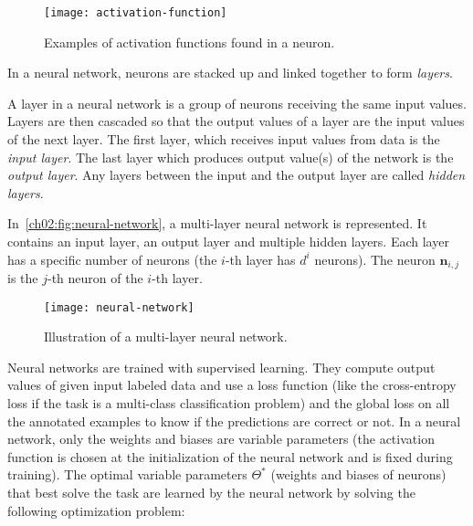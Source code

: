     \begin{figure}[h!]
      \centering
      \texttt{[image: activation-function]}
      \caption{Examples of activation functions found in a neuron.}
      \label{ch02:fig:activation-function}
    \end{figure}

    \medskip
    In a neural network, neurons are stacked up and linked together to form
    \textit{layers}.

    \theoremstyle{definition}
    \begin{definition}[A layer]
      A layer in a neural network is a group of neurons receiving the same input
      values. Layers are then cascaded so that the output values of a layer are
      the input values of the next layer. The first layer, which receives input
      values from data is the \textit{input layer}. The last layer which
      produces output value(s) of the network is the \textit{output layer}. Any
      layers between the input and the output layer are called \textit{hidden
      layers}.
    \end{definition}

    \noindent In~\autoref{ch02:fig:neural-network}, a multi-layer neural network
    is represented. It contains an input layer, an output layer and multiple
    hidden layers. Each layer has a specific number of neurons (the $i$-th layer
    has $d^i$ neurons). The neuron $\mathbf{n}_{i, j}$ is the $j$-th neuron of
    the $i$-th layer.

    \begin{figure}[t]
      \centering
      \texttt{[image: neural-network]}
      \caption{Illustration of a multi-layer neural network.}
      \label{ch02:fig:neural-network}
    \end{figure}

    \pagebreak
    Neural networks are trained with supervised learning. They compute output
    values of given input labeled data and use a loss function (like the
    cross-entropy loss if the task is a multi-class classification problem) and
    the global loss on all the annotated examples to know if the predictions are
    correct or not. In a neural network, only the weights and biases are
    variable parameters (the activation function is chosen at the initialization
    of the neural network and is fixed during training). The optimal variable
    parameters $\Theta^*$ (weights and biases of neurons) that best solve the
    task are learned by the neural network by solving the following optimization
    problem:

